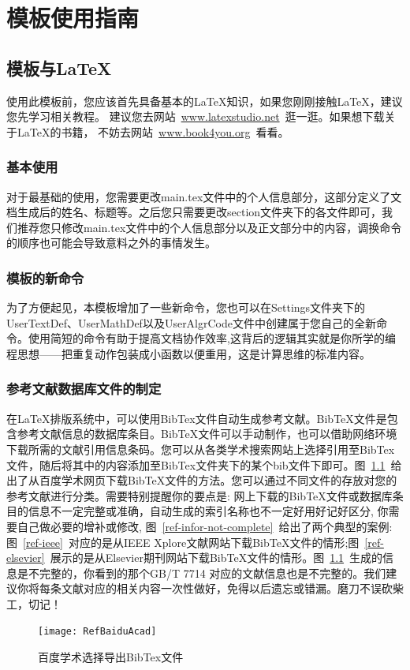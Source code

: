 \chapter{模板使用指南}

\section{模板与\LaTeX{}}
使用此模板前，您应该首先具备基本的{\LaTeX{}}知识，如果您刚刚接触{\LaTeX{}}，建议您先学习相关教程。
建议您去网站~\url{www.latexstudio.net}~逛一逛。如果想下载关于\LaTeX{}的书籍，
不妨去网站~\url{www.book4you.org}~看看。

\subsection{基本使用}
对于最基础的使用，您需要更改main.tex文件中的个人信息部分，这部分定义了文档生成后的姓名、标题等。之后您只需要更改section文件夹下的各文件即可，我们推荐您只修改main.tex文件中的个人信息部分以及正文部分中的内容，调换命令的顺序也可能会导致意料之外的事情发生。

\subsection{模板的新命令}
为了方便起见，本模板增加了一些新命令，您也可以在Settings文件夹下的UserTextDef、UserMathDef以及UserAlgrCode文件中创建属于您自己的全新命令。使用简短的命令有助于提高文档协作效率,这背后的逻辑其实就是你所学的编程思想——把重复动作包装成小函数以便重用，这是计算思维的标准内容。

\subsection{参考文献数据库文件的制定}
在{\LaTeX{}}排版系统中，可以使用BibTex文件自动生成参考文献。BibTeX文件是包含参考文献信息的数据库条目。BibTeX文件可以手动制作，也可以借助网络环境下载所需的文献引用信息条码。您可以从各类学术搜索网站上选择引用至BibTex文件，随后将其中的内容添加至BibTex文件夹下的某个bib文件下即可。图~\ref{ref-baidu-academic}~给出了从百度学术网页下载BibTeX文件的方法。您可以通过不同文件的存放对您的参考文献进行分类。需要特别提醒你的要点是: 网上下载的BibTeX文件或数据库条目的信息不一定完整或准确，自动生成的索引名称也不一定好用好记好区分, 你需要自己做必要的增补或修改, 图~\ref{ref-infor-not-complete}~给出了两个典型的案例: 图~\ref{ref-ieee}~对应的是从IEEE Xplore文献网站下载BibTeX文件的情形;图~\ref{ref-elsevier}~展示的是从Elsevier期刊网站下载BibTeX文件的情形。图~\ref{ref-baidu-academic}~生成的信息是不完整的，你看到的那个GB/T 7714 对应的文献信息也是不完整的。我们建议你将每条文献对应的相关内容一次性做好，免得以后遗忘或错漏。磨刀不误砍柴工，切记！
\begin{figure}[hp]
	\centering
	\texttt{[image: RefBaiduAcad]}
	\caption{百度学术选择导出BibTex文件}
	\label{ref-baidu-academic}
\end{figure}

